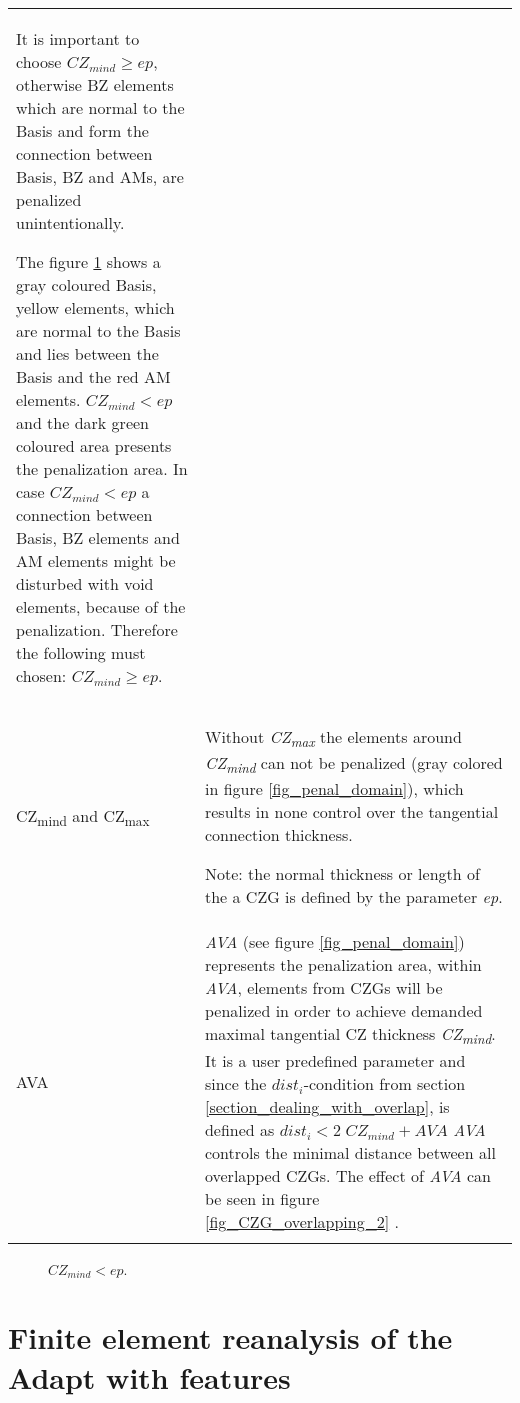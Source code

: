 \begin{longtable}{L{0.2\textwidth} L{0.8\textwidth}}
It is important to choose $CZ_{mind} \geq ep$, otherwise
BZ elements which
are normal to the Basis and  
 form the connection between
Basis, BZ and AMs, are penalized unintentionally.

The figure \ref{fig_ep_geq_ep} shows a gray coloured Basis,
yellow  elements, which are normal to the Basis and
lies between the Basis and the red AM elements. 
$CZ_{mind} < ep$ and the dark green  coloured area presents the 
penalization area. In case $CZ_{mind} < ep$ a connection
between Basis, BZ elements and AM elements might
be disturbed with void elements, because of the
penalization. Therefore the following must
chosen: $CZ_{mind} \geq ep$.\\

 CZ\textsubscript{mind} and CZ\textsubscript{max} & Without \textit{CZ\textsubscript{max}}  the elements around 
\textit{CZ\textsubscript{mind}} can not be penalized (gray colored in
figure \ref{fig_penal_domain}),
which results in none control over the tangential connection thickness.

Note: the normal thickness or length of the
a CZG is defined by the parameter \textit{ep}. 
\\
 \hline 
AVA & \textit{AVA} (see figure \ref{fig_penal_domain})
 represents the penalization area, within \textit{AVA}, elements
from CZGs will be penalized in order to achieve demanded maximal
tangential CZ thickness \textit{CZ\textsubscript{mind}}. It
is a user predefined parameter and since 
the $dist_i $-condition from 
section \ref{section_dealing_with_overlap}, is defined as 
$dist_i < 2 \; CZ_{mind} +AVA $
\textit{AVA} controls the minimal distance between all
overlapped CZGs.
The effect of \textit{AVA} can be seen in figure 
\ref{fig_CZG_overlapping_2} .  \\
\hline
\label{table_third_task}
\end{longtable}
\endgroup 

\begin{figure}[!h]
  \centering
 \def\svgwidth{0.45\textwidth}
 
 \caption{ $ CZ_{mind} < ep$.}    %
 \label{fig_ep_geq_ep}          %
\end{figure}

 
  
 \section{Finite element reanalysis of the Adapt with features}
 \label{section_fea_features}
 
